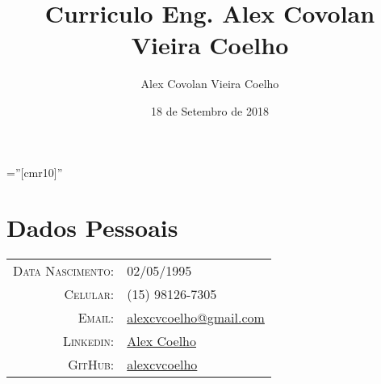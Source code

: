 \documentclass[a4paper,10pt]{article}
\title{Curriculo Eng. Alex Covolan Vieira Coelho}
\date{18 de Setembro de 2018}
\author{Alex Covolan Vieira Coelho}
\begin{document}
\pagestyle{empty} %

\font\fb=''[cmr10]'' %

\par{\bigskip\par}

\section{Dados Pessoais}

\begin{tabular}{rl}
    \textsc{Data Nascimento:} & 02/05/1995 \\
    \textsc{Celular:}     & (15) 98126-7305\\
    \textsc{Email:}     & \href{mailto:alexcvcoelho@gmail.com}{alexcvcoelho@gmail.com} \\
    \textsc{Linkedin:} & \href{https://www.linkedin.com/in/alex-coelho-475654a3/}{Alex Coelho} \\
    \textsc{GitHub:} & \href{https://github.com/alexcvcoelho}{alexcvcoelho}
\end{tabular}

\end{document}
